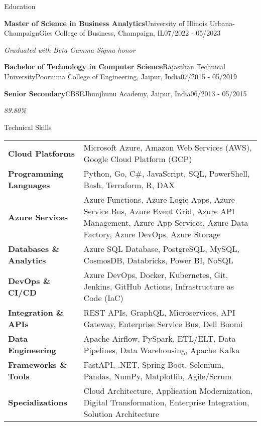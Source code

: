 \documentclass{resume} %
\makeatletter
\newcommand{\italicitem}[1]{\item{\textit{#1}}}
\newcommand{\entry}[2]{#1 & #2 \tabularnewline} %
\newcommand{\tableEnv}[2]{%
    \begin{rSection}{#1} %
        \begin{adjustwidth}{0.0in}{0.1in} %
            \begin{tabularx}{\linewidth}{@{} >{\bfseries}l @{\hspace{6ex}} X @{}}
                #2 %
            \end{tabularx}
        \end{adjustwidth}
    \end{rSection}
}
\makeatother
\begin{document}
    
    
    \begin{rSection}{Education}
        
        \begin{rSubsectionNoBullet}{\bf Master of Science in Business Analytics}{University of Illinois Urbana-Champaign}{Gies College of Business, Champaign, IL}{07/2022 - 05/2023}
            \italicitem{Graduated with Beta Gamma Sigma honor }
        \end{rSubsectionNoBullet}
        
        \begin{rSubsectionNoBullet}{\bf Bachelor of Technology in Computer Science}{Rajasthan Technical University}{Poornima College of Engineering, Jaipur, India}{07/2015 - 05/2019}
            \italicitem{}
        \end{rSubsectionNoBullet}
        
        \begin{rSubsectionNoBullet}{\bf Senior Secondary}{CBSE}{Jhunjhunu Academy, Jaipur, India}{06/2013 - 05/2015}
            \italicitem{89.80\%}
        \end{rSubsectionNoBullet}
        
    \end{rSection}
    
    \newpage
    
    \tableEnv{Technical Skills}{
        \entry{Cloud Platforms}{Microsoft Azure, Amazon Web Services (AWS), Google Cloud Platform (GCP)}
        \entry{Programming Languages}{Python, Go, C\#, JavaScript, SQL, PowerShell, Bash, Terraform, R, DAX}
        \entry{Azure Services}{Azure Functions, Azure Logic Apps, Azure Service Bus, Azure Event Grid, Azure API Management, Azure App Services, Azure Data Factory, Azure DevOps, Azure Storage}
        \entry{Databases \& Analytics}{Azure SQL Database, PostgreSQL, MySQL, CosmosDB, Databricks, Power BI, NoSQL}
        \entry{DevOps \& CI/CD}{Azure DevOps, Docker, Kubernetes, Git, Jenkins, GitHub Actions, Infrastructure as Code (IaC)}
        \entry{Integration \& APIs}{REST APIs, GraphQL, Microservices, API Gateway, Enterprise Service Bus, Dell Boomi}
        \entry{Data Engineering}{Apache Airflow, PySpark, ETL/ELT, Data Pipelines, Data Warehousing, Apache Kafka}
        \entry{Frameworks \& Tools}{FastAPI, .NET, Spring Boot, Selenium, Pandas, NumPy, Matplotlib, Agile/Scrum}
        \entry{Specializations}{Cloud Architecture, Application Modernization, Digital Transformation, Enterprise Integration, Solution Architecture}
    }
    
\end{document}
